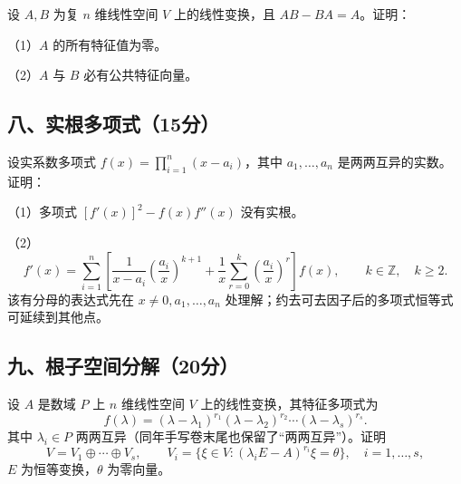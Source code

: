 \documentclass[11pt,fontset=fandol]{ctexart}
\begin{document}
设 \(A,B\) 为复 \(n\) 维线性空间 \(V\) 上的线性变换，且
\(AB-BA=A\)。证明：

（1）\(A\) 的所有特征值为零。

（2）\(A\) 与 \(B\) 必有公共特征向量。

\subsection{八、实根多项式（15分）}\label{ux516bux5b9eux6839ux591aux9879ux5f0f15ux5206}

设实系数多项式 \(f(x)=\prod_{i=1}^n(x-a_i)\)，其中 \(a_1,\ldots,a_n\)
是两两互异的实数。证明：

（1）多项式 \([f'(x)]^2-f(x)f''(x)\) 没有实根。

（2） \[
f'(x)=\sum_{i=1}^n\left[\frac1{x-a_i}\left(\frac{a_i}{x}\right)^{k+1}
+\frac1x\sum_{r=0}^k\left(\frac{a_i}{x}\right)^r\right]f(x),\qquad k\in\mathbb Z,\quad k\ge2.
\] 该有分母的表达式先在 \(x\ne0,a_1,\ldots,a_n\)
处理解；约去可去因子后的多项式恒等式可延续到其他点。

\subsection{九、根子空间分解（20分）}\label{ux4e5dux6839ux5b50ux7a7aux95f4ux5206ux89e320ux5206}

设 \(A\) 是数域 \(P\) 上 \(n\) 维线性空间 \(V\)
上的线性变换，其特征多项式为 \[
f(\lambda)=(\lambda-\lambda_1)^{r_1}(\lambda-\lambda_2)^{r_2}\cdots(\lambda-\lambda_s)^{r_s}.
\] 其中 \(\lambda_i\in P\)
两两互异（同年手写卷末尾也保留了``两两互异''）。证明 \[
V=V_1\oplus\cdots\oplus V_s,\qquad
V_i=\{\xi\in V:(\lambda_iE-A)^{r_i}\xi=\theta\},\quad i=1,\ldots,s,
\] \(E\) 为恒等变换，\(\theta\) 为零向量。
\end{document}
